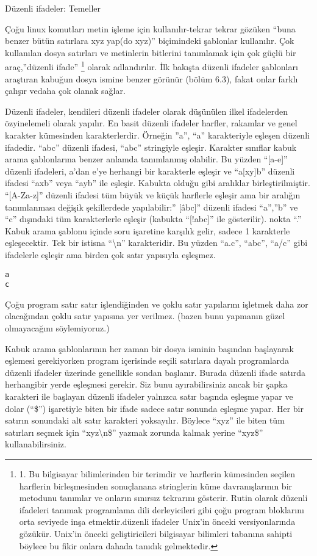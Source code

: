 \documentclass[10pt,a5paper]{book}
\begin{document}
\begin{section}{Düzenli ifadeler: Temeller}

Çoğu linux komutları metin işleme için kullanılır-tekrar tekrar gözüken “buna benzer bütün satırlara xyz yap(do xyz)” biçimindeki şablonlar kullanılır. Çok kullanılan dosya satırları ve metinlerin bitlerini tanımlamak için çok güçlü bir araç,”düzenli ifade” 
\footnote{1.	Bu bilgisayar bilimlerinden bir terimdir ve harflerin kümesinden seçilen harflerin birleşmesinden sonuçlanana stringlerin küme davranışlarının bir metodunu tanımlar ve onların sınırsız tekrarını gösterir. Rutin olarak düzenli ifadeleri tanımak programlama dili derleyicileri gibi çoğu program bloklarını orta seviyede inşa etmektir.düzenli ifadeler Unix’in önceki versiyonlarında gözükür. Unix’in önceki geliştiricileri bilgisayar bilimleri tabanına sahipti böylece bu fikir onlara dahada tanıdık gelmektedir.}  olarak adlandırılır. İlk bakışta düzenli ifadeler şablonları araştıran kabuğun dosya ismine benzer görünür (bölüm 6.3), fakat onlar farklı çalışır vedaha çok olanak sağlar. 

Düzenli ifadeler, kendileri düzenli ifadeler olarak düşünülen ilkel ifadelerden özyinelemeli olarak yapılır. En basit düzenli ifadeler harfler, rakamlar ve genel karakter kümesinden karakterlerdir. Örneğin ”a”, “a” karakteriyle eşleşen düzenli ifadedir. “abc” düzenli ifadesi, “abc” stringiyle  eşleşir. Karakter sınıflar kabuk arama şablonlarına benzer anlamda tanımlanmış olabilir. Bu yüzden “[a-e]” düzenli ifadeleri, a’dan e’ye herhangi bir karakterle eşleşir ve “a[xy]b” düzenli ifadesi “axb” veya “ayb” ile eşleşir. Kabukta olduğu gibi aralıklar birleştirilmiştir. “[A-Za-z]” düzenli ifadesi tüm büyük ve küçük harflerle eşleşir ama bir aralığın tanımlanması değişik şekillerdede yapılabilir:” [\^abc]” düzenli ifadesi  “a”,”b” ve “c” dışındaki tüm karakterlerle eşleşir (kabukta “[!abc]” ile gösterilir). nokta “.” Kabuk arama şablonu içinde soru işaretine karşılık gelir, sadece 1 karakterle eşleşecektir. Tek bir istisna “\textbackslash n” karakteridir. Bu yüzden “a.c”, “abc”, “a/c” gibi ifadelerle eşleşir ama birden çok satır yapısıyla eşleşmez.
\begin{verbatim}
a
c
\end{verbatim}

Çoğu program satır satır işlendiğinden  ve çoklu satır yapılarını işletmek daha zor olacağından çoklu satır yapısına yer verilmez. (bazen bunu yapmanın güzel olmayacağını söylemiyoruz.)

Kabuk arama şablonlarının her zaman bir dosya isminin başından başlayarak  eşlemesi gerekiyorken program içerisinde seçili satırlara dayalı programlarda düzenli ifadeler üzerinde genellikle sondan başlanır. Burada düzenli ifade satırda herhangibir yerde eşleşmesi gerekir.  Siz bunu ayırabilirsiniz ancak bir şapka karakteri ile başlayan düzenli ifadeler yalnızca satır başında eşleşme yapar ve dolar (“\$”) işaretiyle biten bir ifade sadece satır sonunda eşleşme yapar. Her bir satırın sonundaki alt satır karakteri yoksayılır. Böylece “xyz” ile biten tüm satırları seçmek için “xyz\textbackslash n\$” yazmak zorunda kalmak yerine “xyz\$” kullanabilirsiniz.


\end{section}
\end{document}

